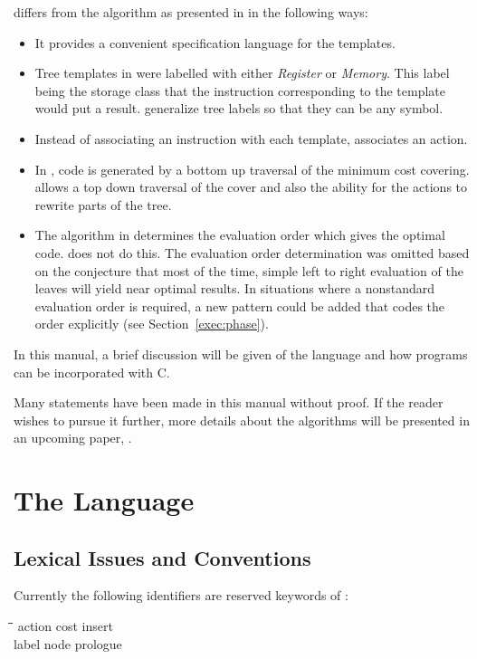 \Twiglang{} differs from the algorithm as presented in \cite{optimalcode} in
the following ways:
\begin{itemize}
\item
It provides a convenient specification language for the templates.
\item
Tree templates in \cite{optimalcode} were labelled with either {\sl Register} or
{\sl Memory}.  This label being the storage class that the instruction corresponding
to the template would put a result.
\Twiglang{} generalize tree labels so that
they can be any symbol.
\item
Instead of associating an instruction with each template, \twiglang{} associates
an action.
\item
In \cite{optimalcode}, code is generated by a bottom up traversal of the
minimum cost covering.  \Twiglang{} allows a top down traversal of the cover
and also the ability for the actions to rewrite parts of the
tree.
\item
The algorithm in \cite{optimalcode} determines the evaluation order
which gives the optimal code.
\Twiglang{} does not do this.
The evaluation order determination was omitted based on the conjecture that
most of the time, simple left to right evaluation of the leaves will yield
near optimal results.
In situations where a nonstandard evaluation order is required, a new
\twiglang{} pattern could be added that codes the order explicitly
(see Section~\ref{exec:phase}).
\end{itemize}

In this manual, a brief discussion will be given of the \twiglang{} language
and how \twiglang{} programs can be incorporated with C.

Many statements have been made in this manual without proof.
If the reader wishes to pursue it further, more details about the algorithms
will be presented in an upcoming paper,
\cite{aho:gana:tjiang}.

\section{The \Twiglang{} Language}
\subsection{Lexical Issues and Conventions}
Currently the
following identifiers are reserved keywords of \twiglang{}:

\begin{tabbing}
\hspace{1in}\=\hspace{1in}\=\hspace{1in}\=\kill
action \> cost \> insert \\
label \> node \> prologue
\end{tabbing}

